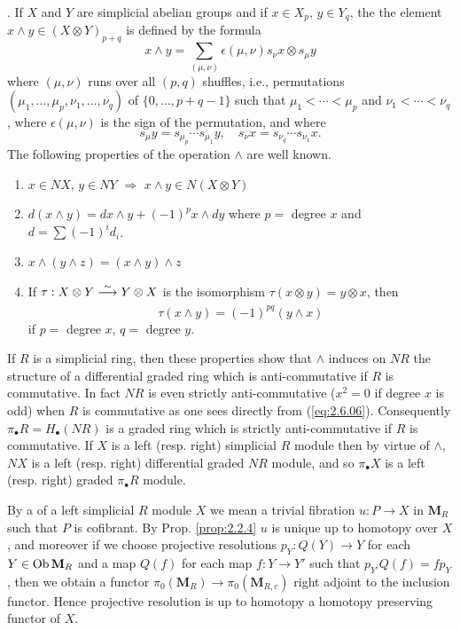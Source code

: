 \documentclass[../main]{subfiles}
\begin{document}
. If $X$ and $Y$ are simplicial abelian groups and if $x\in X_p$, $y\in Y_q$, the the element $x\wedge y\in (X\otimes Y)_{p+q}$ is defined by the formula
\begin{equation}\tag{6}
\label{eq:2.6.06}
    x\wedge y=\sum_{(\mu,\nu)}\epsilon(\mu,\nu)s_{\nu}x\otimes s_{\mu}y
\end{equation}
where $(\mu,\nu)$ runs over all $(p,q)$ shuffles, i.e., permutations $(\mu_1,\dots,\mu_p,\nu_1,\dots,\nu_q)$ of $\{0,\dots,p+q-1\}$ such that $\mu_1<\cdots<\mu_p$ and $\nu_1<\cdots<\nu_q$, where $\epsilon(\mu,\nu)$ is the sign of the permutation, and where
\[s_{\mu}y=s_{\mu_{p}}\cdots s_{\mu_{1}}y,\quad s_{\nu}x=s_{\nu_{q}}\cdots s_{\nu_{1}}x.\]The following properties of the operation $\wedge $ are well known.

\begin{enumerate}[(1)]
    \item $x\in NX$, $y\in NY$ $\Longrightarrow$ $x\wedge y\in N(X\otimes Y)$
    \item $d(x\wedge y)=dx\wedge y+(-1)^px\wedge dy$ where $p=$ degree $x$ and $d=\sum(-1)^id_i$.
    \item $x\wedge (y\wedge z)=(x\wedge y)\wedge z$
    \item If $\tau:X\otimes Y\varrightarrow{\sim}Y\otimes X$ is the isomorphism $\tau(x\otimes y)=y\otimes x$, then \[\tau(x\wedge y)=(-1)^{pq}(y\wedge x)\]if $p=$ degree $x$, $q=$ degree $y$.
\end{enumerate}

If $R$ is a simplicial ring, then these properties show that $\wedge$ induces on $NR$ the structure of a differential graded ring which is anti-commutative if $R$ is commutative. In fact $NR$ is even strictly anti-commutative ($x^2=0$ if degree $x$ is odd) when $R$ is commutative as one sees directly from (\ref{eq:2.6.06}). Consequently $\pi_\bullet R=H_\bullet(NR)$ is a graded ring which is strictly anti-commutative if $R$ is commutative. If $X$ is a left (resp. right) simplicial $R$ module then by virtue of $\wedge$, $NX$ is a left (resp. right) differential graded $NR$ module, and so $\pi_\bullet X$ is a left (resp. right) graded $\pi_\bullet R$ module.

By a  of a left simplicial $R$ module $X$ we mean a trivial fibration $u:P\longrightarrow X$ in $\mathbf M_R$ such that $P$ is cofibrant. By Prop. \ref{prop:2.2.4} $u$ is unique up to homotopy over $X$, and moreover if we choose projective resolutions $p_Y:Q(Y)\longrightarrow Y$ for each $Y\in\operatorname{Ob}\mathbf M_R$ and a map $Q(f)$ for each map $f:Y\longrightarrow Y'$ such that $p_{Y'}Q(f)=fp_Y$, then we obtain a functor $\pi_0(\mathbf M_R)\longrightarrow\pi_0(\mathbf M_{R,c})$ right adjoint to the inclusion functor. Hence projective resolution is up to homotopy a homotopy preserving functor of $X$.
\end{document}
